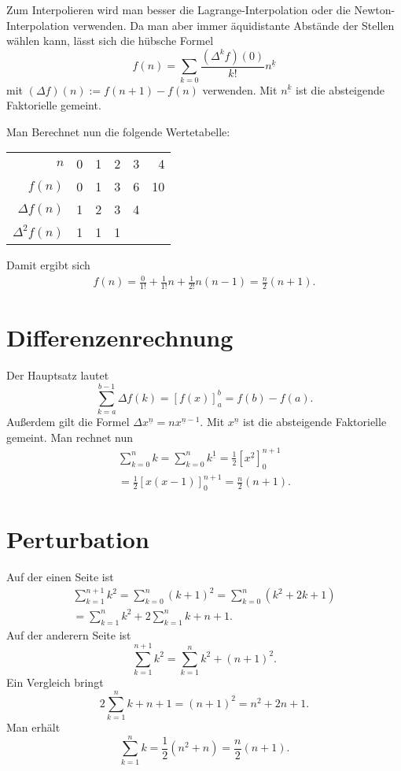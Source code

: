 \documentclass[a4paper,11pt,fleqn,twocolumn,twoside]{scrartcl}
\begin{document}
Zum Interpolieren wird man besser die Lagrange-Interpolation oder
die Newton-Interpolation verwenden. Da man aber immer äquidistante
Abstände der Stellen wählen kann, lässt sich die hübsche Formel%
\[f(n) = \sum_{k=0} \frac{(\Delta^k f)(0)}{k!}n^{\underline k}\]
mit $(\Delta f)(n):=f(n+1)-f(n)$ verwenden.
Mit $n^{\underline k}$ ist die absteigende Faktorielle gemeint.

Man Berechnet nun die folgende Wertetabelle:
\begin{table}[h]
\qquad\begin{tabular}{@{\;}rrrrrr@{\;}}
\toprule
$n$    & 0 & 1 & 2 & 3 & 4\\
$f(n)$ & 0 & 1 & 3 & 6 & 10\\
$\Delta f(n)$ & 1 & 2 & 3 & 4\\
$\Delta^2 f(n)$ & 1 & 1 & 1\\
\bottomrule
\end{tabular}
\end{table}

\noindent
Damit ergibt sich
\begin{gather*}
f(n) = \frac{0}{1!} + \frac{1}{1!}n + \frac{1}{2!}n(n-1)
= \frac{n}{2}(n+1).
\end{gather*}

\section{Differenzenrechnung}

Der Hauptsatz lautet
\[\sum_{k=a}^{b-1} \Delta f(k) = [f(x)]_a^b = f(b)-f(a).\]
Außerdem gilt die Formel $\Delta x^{\underline n} = nx^{\underline n-1}$.
Mit $x^{\underline n}$ ist die absteigende Faktorielle gemeint.
Man rechnet nun%
\begin{gather*}\sum_{k=0}^{n} k = \sum_{k=0}^{n} k^{\underline 1}
= \frac{1}{2}[x^{\underline{2}}]_0^{n+1}\\
= \frac{1}{2}[x(x-1)]_0^{n+1}
= \frac{n}{2}(n+1).
\end{gather*}

\section{Perturbation}

Auf der einen Seite ist
\begin{gather*}
\sum_{k=1}^{n+1} k^2 = \sum_{k=0}^n (k+1)^2
= \sum_{k=0}^n (k^2+2k+1)\\
= \sum_{k=1}^n k^2 + 2\sum_{k=1}^n k + n+1.
\end{gather*}
Auf der anderern Seite ist
\[\sum_{k=1}^{n+1} k^2 = \sum_{k=1}^n k^2 + (n+1)^2.\]
Ein Vergleich bringt
\[2\sum_{k=1}^n k +n+1 = (n+1)^2 = n^2+2n+1.\]
Man erhält
\[\sum_{k=1}^n k = \frac{1}{2}(n^2+n) = \frac{n}{2}(n+1).\]
\end{document}
